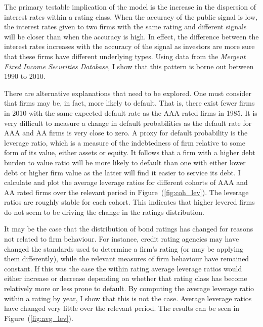 \documentclass[notitlepage]{article}
\begin{document}
The primary testable implication of the model is the increase in the dispersion of interest rates within a rating class. When the accuracy of the public signal is low, the interest rates given to two firms with the same rating and different signals will be closer than when the accuracy is high. In effect, the difference between the interest rates increases with the accuracy of the signal as investors are more sure that these firms have different underlying types. Using data from the \textit{Mergent Fixed Income Securities Database}, I show that this pattern is borne out between 1990 to 2010. 


There are alternative explanations that need to be explored. One must consider that firms may be, in fact, more likely to default. That is, there exist fewer firms in 2010 with the same expected default rate as the AAA rated firms in 1985. It is very difficult to measure a change in default probabilities as the default rate for AAA and AA firms is very close to zero. A proxy for default probability is the leverage ratio, which is a measure of the indebtedness of firm relative to some form of its value, either assets or equity. It follows that a firm with a higher debt burden to value ratio will be more likely to default than one with either lower debt or higher firm value as the latter will find it easier to service its debt. I calculate and plot the average leverage ratios for different cohorts of AAA and AA rated firms over the relevant period in Figure~(\ref{fig:coh_lev}). The leverage ratios are roughly stable for each cohort. This indicates that higher levered firms do not seem to be driving the change in the ratings distribution.

It may be the case that the distribution of bond ratings has changed for reasons not related to firm behaviour. For instance, credit rating agencies may have changed the standards used to determine a firm's rating (or may be applying them differently), while the relevant measures of firm behaviour have remained constant. If this was the case the within rating average leverage ratios would either increase or decrease depending on whether that rating class has become relatively more or less prone to default. By computing the average leverage ratio within a rating by year, I show that this is not the case. Average leverage ratios have changed very little over the relevant period. The results can be seen in Figure~(\ref{fig:avg_lev}). 
\end{document}
